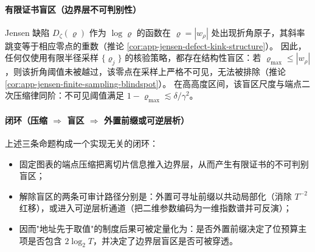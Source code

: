 \paragraph{有限证书盲区（边界层不可判别性）}
Jensen 缺陷 \(D_\zeta(\varrho)\) 作为 \(\log\varrho\) 的函数在 \(\varrho=|w_\rho|\) 处出现折角原子，其斜率跳变等于相应零点的重数（推论 \ref{cor:app-jensen-defect-kink-structure}）。
因此，任何仅使用有限半径采样 \(\{\varrho_j\}\) 的核验策略，都存在结构性盲区：若 \(\varrho_{\max}\le |w_\rho|\)，则该折角阈值未被越过，该零点在采样上严格不可见，无法被排除（推论 \ref{cor:app-jensen-finite-sampling-blindspot}）。
在高高度区间，该盲区尺度与端点二次压缩律同阶：不可见阈值满足 \(1-\varrho_{\max}\lesssim \delta/\gamma^2\)。

\paragraph{闭环（压缩 \texorpdfstring{$\Rightarrow$}{=>} 盲区 \texorpdfstring{$\Rightarrow$}{=>} 外置前缀或可逆层析）}
上述三条命题构成一个实现无关的闭环：
\begin{itemize}
  \item 固定图表的端点压缩把离切片信息推入边界层，从而产生有限证书的不可判别盲区；
  \item 解除盲区的两条可审计路径分别是：外置可寻址前缀以共动局部化（消除 \(T^{-2}\) 红移），或进入可逆层析通道（把二维参数编码为一维指数谱并可反演）；
  \item 因而"地址先于取值"的制度后果可被定量化为：是否外置前缀决定了位预算主项是否包含 \(2\log_2T\)，并决定了边界层盲区是否可被穿透。
\end{itemize}

\endinput
